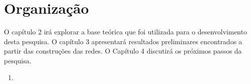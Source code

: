 \section{Organização}
\label{sec:organization}

O capítulo 2 irá explorar a base teórica que foi utilizada para o desenvolvimento desta pesquisa. O capítulo 3 apresentará resultados preliminares encontrados a partir das construções das redes. O Capítulo 4 discutirá os próximos passos da pesquisa.
\begin{enumerate}
\item 
\end{enumerate}
